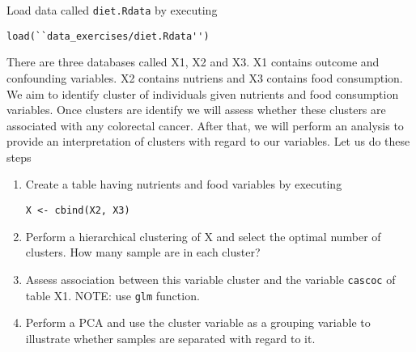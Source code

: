 \documentclass[11pt]{article}
\begin{document}
  Load data called {\tt diet.Rdata} by executing 

\begin{verbatim}
load(``data_exercises/diet.Rdata'')
\end{verbatim}

There are three databases called X1, X2 and X3. X1 contains outcome and confounding variables. X2 contains nutriens and X3 contains food consumption. We aim to identify cluster of individuals given nutrients and food consumption variables. Once clusters are identify we will assess whether these clusters are associated with any colorectal cancer. After that, we will perform an analysis to provide an interpretation of clusters with regard to our variables. Let us do these steps 

\begin{enumerate}
\item Create a table having nutrients and food variables by executing 
\begin{verbatim}
X <- cbind(X2, X3)
\end{verbatim}

\item Perform a hierarchical clustering of X and select the optimal number of clusters. How many sample are in each cluster?

\item Assess association between this variable cluster and the variable {\tt cascoc} of table X1. NOTE: use {\tt glm} function.

\item Perform a PCA and use the cluster variable as a grouping variable to illustrate whether samples are separated with regard to it.

\end{enumerate}
\end{document}
